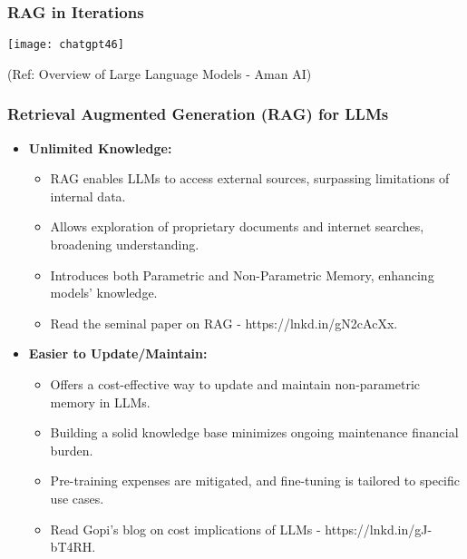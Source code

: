 \begin{frame}[fragile]\frametitle{RAG in Iterations}


\begin{center}
\texttt{[image: chatgpt46]}
\end{center}

{\tiny (Ref: Overview of Large Language Models - Aman AI)}

\end{frame}

\begin{frame}[fragile]\frametitle{Retrieval Augmented Generation (RAG) for LLMs}
\begin{itemize}
  \item \textbf{Unlimited Knowledge:}
    \begin{itemize}
      \item RAG enables LLMs to access external sources, surpassing limitations of internal data.
      \item Allows exploration of proprietary documents and internet searches, broadening understanding.
      \item Introduces both Parametric and Non-Parametric Memory, enhancing models' knowledge.
      \item Read the seminal paper on RAG - https://lnkd.in/gN2cAcXx.
    \end{itemize}
  
  \item \textbf{Easier to Update/Maintain:}
    \begin{itemize}
      \item Offers a cost-effective way to update and maintain non-parametric memory in LLMs.
      \item Building a solid knowledge base minimizes ongoing maintenance financial burden.
      \item Pre-training expenses are mitigated, and fine-tuning is tailored to specific use cases.
      \item Read Gopi's blog on cost implications of LLMs - https://lnkd.in/gJ-bT4RH.
    \end{itemize}
\end{itemize}

\end{frame}

